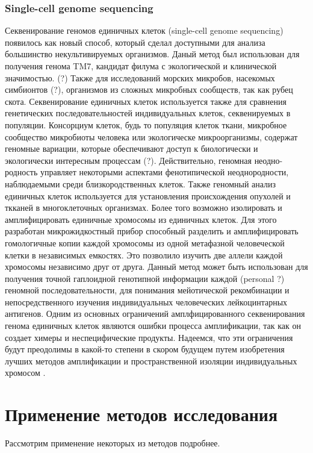 \subsubsection{Single-cell genome sequencing}
Секвенирование геномов единичных клеток (single-cell genome sequencing) появилось как
новый способ, который сделал доступными для анализа большинство некультивируемых организмов. Даный метод был использован для получения генома TM7, кандидат филума с
экологической и клинической значимостью. (?) Также для исследований морских микробов,
насекомых симбионтов (?), организмов из сложных микробных сообществ, так как рубец
скота. Секвенирование единичных клеток используется также для сравнения генетических
последовательностей индивидуальных клеток, секвенируемых в популяции. Консорциум клеток, будь то популяция клеток ткани, микробное сообщество микробиоты человека или экологическе микроорганизмы, содержат геномные вариации, которые обеспечивают доступ к
биологически и экологически интересным процессам (?). Действительно, геномная неодно-
родность управляет некоторыми аспектами фенотипической неоднородности, наблюдаемыми
среди близкородственных клеток. Также геномный анализ единичных клеток используется
для установления происхождения опухолей и ткканей в многоклеточных организмах. Более того возможно изолировать и амплифицировать единичные хромосомы из единичных
клеток. Для этого разработан микрожидкостный прибор способный разделить и амплифицировать гомологичные копии каждой хромосомы из одной метафазной человеческой клетки
в независимых емкостях. Это позволило изучить две аллели каждой хромосомы независимо
друг от друга. Данный метод может быть использован для получения точной гаплоидной
генотипной информации каждой (personal ?) геномной последовательности, для понимания
мейотической рекомбинации и непосредственного изучения индивидуальных человеческих
лейкоцинтарных антигенов. Одним из основных ограничений амплфицированного секвенирования генома единичных клеток являются ошибки процесса амплификации, так как он
создает химеры и неспецифические продукты. Надеемся, что эти ограничения будут преодолимы в какой-то степени в скором будущем путем изобретения лучших методов амплификации и пространственной изоляции индивидуальных хромосом \cite{Kalisky2014, Roh2010}.

\section{Применение методов исследования}
Рассмотрим применение некоторых из методов подробнее.

